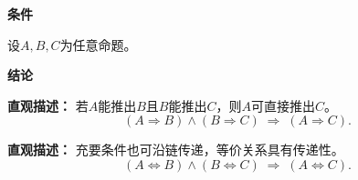 \begin{statementbox}
	\textbf{\textcolor{CStatement}{条件}}
	\begin{description}[style=nextline, leftmargin=2.8em, labelsep=0.5em, itemsep=0.35em]
		\item[\textbf{\textcolor{CStatement}{条件1（命题设定）：}}] 设$A,B,C$为任意命题。
	\end{description}

	\textbf{\textcolor{CStatement}{结论}}
	\begin{description}[style=nextline, leftmargin=2.8em, labelsep=0.5em, itemsep=0.45em]
		\item[\textbf{\textcolor{CStatement}{结论一（推出传递）：}}]
			\textbf{\textcolor{CStatement}{直观描述：}}
			若$A$能推出$B$且$B$能推出$C$，则$A$可直接推出$C$。
			\[
				(A\Rightarrow B)\land(B\Rightarrow C)\;\Rightarrow\;(A\Rightarrow C).
			\]

		\item[\textbf{\textcolor{CStatement}{推广结论（等价传递）：}}]
			\textbf{\textcolor{CStatement}{直观描述：}}
			充要条件也可沿链传递，等价关系具有传递性。
			\[
				(A\Leftrightarrow B)\land(B\Leftrightarrow C)\;\Rightarrow\;(A\Leftrightarrow C).
			\]
	\end{description}
\end{statementbox}
